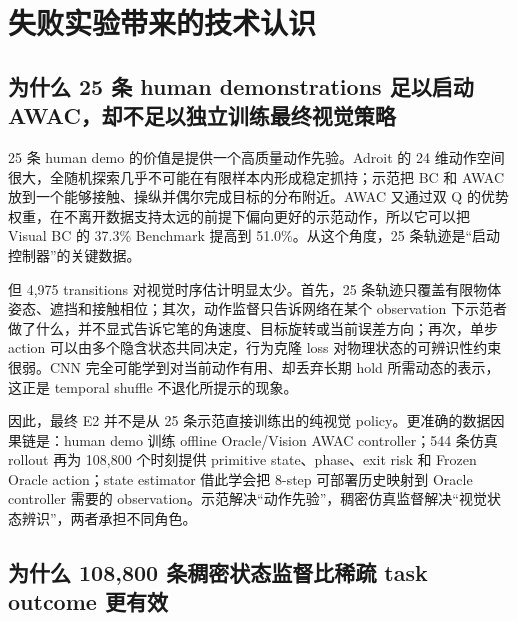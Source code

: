 \hypertarget{ux5931ux8d25ux5b9eux9a8cux5e26ux6765ux7684ux6280ux672fux8ba4ux8bc6}{%
\section{失败实验带来的技术认识}\label{ux5931ux8d25ux5b9eux9a8cux5e26ux6765ux7684ux6280ux672fux8ba4ux8bc6}}

\hypertarget{ux4e3aux4ec0ux4e48-25-ux6761-human-demonstrations-ux8db3ux4ee5ux542fux52a8-awacux5374ux4e0dux8db3ux4ee5ux72ecux7acbux8badux7ec3ux6700ux7ec8ux89c6ux89c9ux7b56ux7565}{%
\subsection{为什么 25 条 human demonstrations 足以启动 AWAC，却不足以独立训练最终视觉策略}\label{ux4e3aux4ec0ux4e48-25-ux6761-human-demonstrations-ux8db3ux4ee5ux542fux52a8-awacux5374ux4e0dux8db3ux4ee5ux72ecux7acbux8badux7ec3ux6700ux7ec8ux89c6ux89c9ux7b56ux7565}}

25 条 human demo 的价值是提供一个高质量动作先验。Adroit 的 24 维动作空间很大，全随机探索几乎不可能在有限样本内形成稳定抓持；示范把 BC 和 AWAC 放到一个能够接触、操纵并偶尔完成目标的分布附近。AWAC 又通过双 Q 的优势权重，在不离开数据支持太远的前提下偏向更好的示范动作，所以它可以把 Visual BC 的 37.3\% Benchmark 提高到 51.0\%。从这个角度，25 条轨迹是``启动控制器''的关键数据。

但 4,975 transitions 对视觉时序估计明显太少。首先，25 条轨迹只覆盖有限物体姿态、遮挡和接触相位；其次，动作监督只告诉网络在某个 observation 下示范者做了什么，并不显式告诉它笔的角速度、目标旋转或当前误差方向；再次，单步 action 可以由多个隐含状态共同决定，行为克隆 loss 对物理状态的可辨识性约束很弱。CNN 完全可能学到对当前动作有用、却丢弃长期 hold 所需动态的表示，这正是 temporal shuffle 不退化所提示的现象。

因此，最终 E2 并不是从 25 条示范直接训练出的纯视觉 policy。更准确的数据因果链是：human demo 训练 offline Oracle/Vision AWAC controller；544 条仿真 rollout 再为 108,800 个时刻提供 primitive state、phase、exit risk 和 Frozen Oracle action；state estimator 借此学会把 8-step 可部署历史映射到 Oracle controller 需要的 observation。示范解决``动作先验''，稠密仿真监督解决``视觉状态辨识''，两者承担不同角色。

\hypertarget{ux4e3aux4ec0ux4e48-108800-ux6761ux7a20ux5bc6ux72b6ux6001ux76d1ux7763ux6bd4ux7a00ux758f-task-outcome-ux66f4ux6709ux6548}{%
\subsection{为什么 108,800 条稠密状态监督比稀疏 task outcome 更有效}\label{ux4e3aux4ec0ux4e48-108800-ux6761ux7a20ux5bc6ux72b6ux6001ux76d1ux7763ux6bd4ux7a00ux758f-task-outcome-ux66f4ux6709ux6548}}

